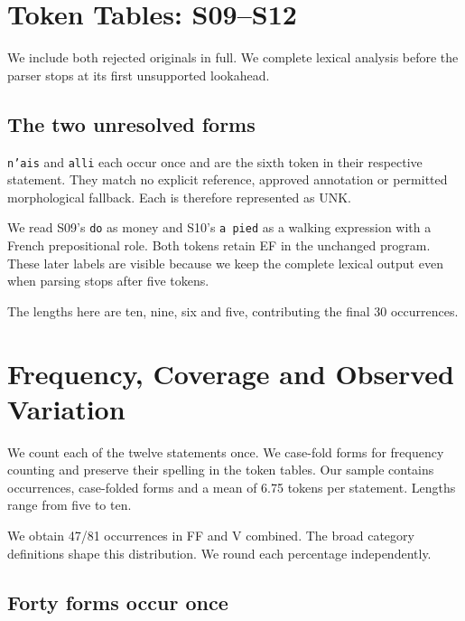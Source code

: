 \documentclass[11pt]{article}
\newcommand{\code}[1]{\texttt{#1}}
\begin{document}
\clearpage
\section{Token Tables: S09--S12}
We include both rejected originals in full. We complete lexical analysis
before the parser stops at its first unsupported lookahead.

{\small}

\subsection*{The two unresolved forms}
\code{n'ais} and \code{alli} each occur once and are the sixth token in their
respective statement. They match no explicit reference, approved annotation
or permitted morphological fallback. Each is therefore represented as UNK.

We read S09's \code{do} as money and S10's \code{a pied} as a walking
expression with a French prepositional role. Both tokens retain EF in the
unchanged program. These later labels are visible because we keep the
complete lexical output even when parsing stops after five tokens.

The lengths here are ten, nine, six and five, contributing the final 30
occurrences.

\clearpage
\section{Frequency, Coverage and Observed Variation}
We count each of the twelve statements once. We case-fold forms for frequency
counting and preserve their spelling in the token tables.
Our sample contains \CorpusTokens{} occurrences, \CorpusForms{} case-folded
forms and a mean of 6.75 tokens per statement. Lengths range from five to ten.

\begin{minipage}[t]{0.55\linewidth}
{\footnotesize}
\par\medskip
{\small We obtain 47/81 occurrences in FF and V combined. The broad category
definitions shape this distribution. We round each percentage independently.}
\end{minipage}\hfill
\begin{minipage}[t]{0.40\linewidth}
{\small}
\end{minipage}

\subsection*{Forty forms occur once}
{\small}
\end{document}
